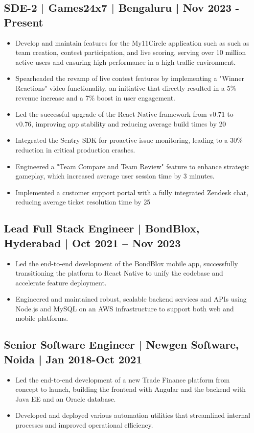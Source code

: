 \documentclass[11pt,a4paper]{article}
\begin{document}
\subsection{SDE-2 | Games24x7 | Bengaluru | Nov 2023 - Present}
\begin{itemize}
\item Develop and maintain features for the My11Circle application such as  such as team creation, contest participation, and live scoring, serving over 10 million active users and ensuring high performance in a high-traffic environment.
\item Spearheaded the revamp of live contest features by implementing a "Winner Reactions" video functionality, an initiative that directly resulted in a 5\% revenue increase and a 7\% boost in user engagement.
\item Led the successful upgrade of the React Native framework from v0.71 to v0.76, improving app stability and reducing average build times by 20%
\item Integrated the Sentry SDK for proactive issue monitoring, leading to a 30\% reduction in critical production crashes.
\item Engineered a "Team Compare and Team Review" feature to enhance strategic gameplay, which increased average user session time by 3 minutes.
\item Implemented a customer support portal with a fully integrated Zendesk chat, reducing average ticket resolution time by 25%
\end{itemize}

\subsection{Lead Full Stack Engineer | BondBlox, Hyderabad | Oct 2021 – Nov 2023}
\begin{itemize}
    \item Led the end-to-end development of the BondBlox mobile app, successfully transitioning the platform to React Native to unify the codebase and accelerate feature deployment.
    \item Engineered and maintained robust, scalable backend services and APIs using Node.js and MySQL on an AWS infrastructure to support both web and mobile platforms.
\end{itemize}

\subsection{Senior Software Engineer | Newgen Software, Noida | Jan 2018-Oct 2021}
\begin{itemize}
    \item Led the end-to-end development of a new Trade Finance platform from concept to launch, building the frontend with Angular and the backend with Java EE and an Oracle database.
    \item Developed and deployed various automation utilities that streamlined internal processes and improved operational efficiency.
\end{itemize}
\end{document}
